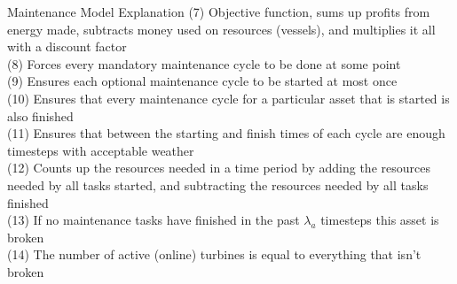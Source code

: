 \documentclass{beamer}
\begin{document}
\begin{frame}{Maintenance  Model Explanation}
\footnotesize
(7) Objective function, sums up profits from energy made, subtracts money used on resources (vessels), and multiplies it all with a discount factor	\\
(8) Forces every mandatory maintenance cycle to be done at some point	\\
(9) Ensures each optional maintenance cycle to be started at most once	\\
(10) Ensures that every maintenance cycle for a particular asset that is started is also finished	\\
(11) Ensures that between the starting and finish times of each cycle are enough timesteps with acceptable weather	\\
(12) Counts up the resources needed in a time period by adding the resources needed by all tasks started, and subtracting the resources needed by all tasks finished	\\
(13) If no maintenance tasks have finished in the past $\lambda_a$ timesteps this asset is broken	\\
(14) The number of active (online) turbines is equal to everything that isn't broken
\end{frame}
\end{document}
